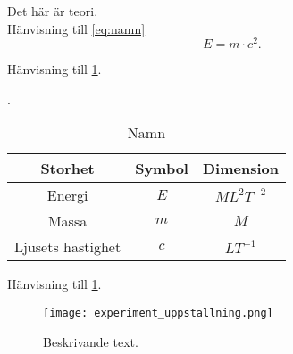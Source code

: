 Det här är teori\cite{einstein}. \\
Hänvisning till \cref{eq:namn}
\begin{equation} \label{eq:namn}
    E=m \cdot c^2.
\end{equation}

Hänvisning till \cref{tab:namn}.
\begin{table}[H]
\caption{Namn} \label{tab:namn}.
\centering 
    \begin{tabular}{|c|c|c|}
    \hline
    \textbf{Storhet} & \textbf{Symbol} & \textbf{Dimension} \\
     \hline
Energi &  $E$ & $ML^2T^{-2}$ \\
    \hline
Massa & $m$ & $M$ \\
    \hline
Ljusets hastighet & $c$ & $LT^{-1}$ \\
    \hline
    \end{tabular} 
\end{table}

Hänvisning till \cref{fig:namn}.
\begin{figure} [H]
    \centering 
    \texttt{[image: experiment\_uppstallning.png]}
    \caption{Beskrivande text.}
    \label{fig:namn}
\end{figure}